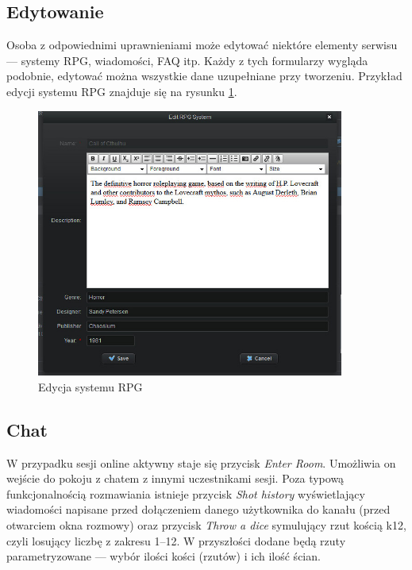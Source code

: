 \clearpage
\subsection*{Edytowanie}
\label{sec:edit}
\hspace{15pt}Osoba z odpowiednimi uprawnieniami może edytować niektóre elementy serwisu --- systemy RPG, wiadomości, FAQ itp. Każdy z tych formularzy wygląda podobnie, edytować można wszystkie dane uzupełniane przy tworzeniu. Przykład edycji systemu RPG znajduje się na rysunku \ref{fig:edit}.

\begin{figure}[h!]	
\centering
\includegraphics[width=0.9\textwidth]{./img/interfejsy/edit}
\caption{Edycja systemu RPG}
\label{fig:edit}
\end{figure}

\clearpage
\subsection*{Chat}
\label{sec:chat}
\hspace{15pt}W przypadku sesji online aktywny staje się przycisk \emph{Enter Room}. Umożliwia on wejście do pokoju z chatem z innymi uczestnikami sesji. Poza typową funkcjonalnością rozmawiania istnieje przycisk \emph{Shot history} wyświetlający wiadomości napisane przed dołączeniem danego użytkownika do kanału (przed otwarciem okna rozmowy) oraz przycisk \emph{Throw a dice} symulujący rzut kością k12, czyli losujący liczbę z zakresu 1--12. W przyszłości dodane będą rzuty parametryzowane --- wybór ilości kości (rzutów) i ich ilość ścian.


